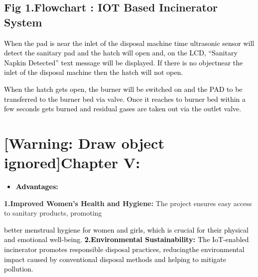 \documentclass[letterpaper]{article}
\newcommand\liststyleWWNumviii{%
\renewcommand\labelitemi{{\textbullet}}
\renewcommand\labelitemii{{\textbullet}}
\renewcommand\labelitemiii{{\textbullet}}
\renewcommand\labelitemiv{{\textbullet}}
}
\begin{document}
\bigskip


\bigskip


\bigskip


\bigskip


\bigskip


\bigskip


\bigskip


\bigskip


\bigskip


\bigskip


\bigskip


\bigskip


\bigskip


\bigskip

\subsection{Fig 1.Flowchart : IOT Based Incinerator System}
\textcolor{black}{When the pad is near the inlet of the disposal machine time ultrasonic sensor will detect the sanitary
pad and the hatch will open and, on the LCD, ``Sanitary Napkin Detected'' text message will be displayed. If there is
no objectnear the inlet of the disposal machine then the hatch will not open.}

\textcolor{black}{When the hatch gets open, the burner will be switched on and the PAD to be transferred to the burner
bed via valve. Once it reaches to burner bed within a few seconds gets burned and residual gases are taken out via the
outlet valve.}

\clearpage\setcounter{page}{1}\pagestyle{Convertedxiii}
\section[Chapter V:]{[Warning: Draw object ignored]Chapter V:}

\bigskip


\bigskip


\bigskip

\liststyleWWNumviii
\begin{itemize}
\item \textbf{\textcolor{black}{Advantages:}}
\end{itemize}
\textbf{1.Improved Women's Health and Hygiene: }The project ensures easy access to sanitary products, promoting

\textcolor{black}{better menstrual hygiene for women and girls, which is crucial for their physical and emotional
well-being. }\textbf{\textcolor{black}{2.Environmental Sustainability: }}\textcolor{black}{The IoT-enabled incinerator
promotes responsible disposal practices, reducingthe environmental impact caused by conventional disposal methods and
helping to mitigate pollution.}
\end{document}
